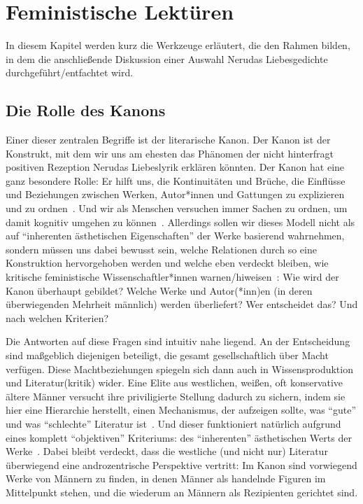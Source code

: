 \section{Feministische Lektüren}


In diesem Kapitel werden kurz die Werkzeuge erläutert, die den Rahmen bilden, in dem die anschließende Diskussion einer Auswahl Nerudas Liebesgedichte durchgeführt/entfachtet wird.

\subsection{Die Rolle des Kanons}

Einer dieser zentralen Begriffe ist der literarische Kanon.
Der Kanon ist der Konstrukt, mit dem wir uns am ehesten das Phänomen der nicht hinterfragt positiven Rezeption Nerudas Liebeslyrik erklären könnten.
Der Kanon hat eine ganz besondere Rolle:
Er hilft uns, die Kontinuitäten und Brüche, die Einflüsse und Beziehungen zwischen Werken, Autor*innen und Gattungen zu explizieren und zu ordnen~\cite{Kolodny1980}.
Und wir als Menschen versuchen immer Sachen zu ordnen, um damit kognitiv umgehen zu können~\cite{JorRus1999}.
Allerdings sollen wir dieses Modell nicht als auf ``inherenten ästhetischen Eigenschaften'' der Werke basierend wahrnehmen, sondern müssen uns dabei bewusst sein, welche Relationen durch so eine Konstruktion hervorgehoben werden und welche eben verdeckt bleiben, wie kritische feministische Wissenschaftler*innen warnen/hiweisen~\cite{Kolodny1980}:
Wie wird der Kanon überhaupt gebildet?
Welche Werke und Autor(*inn)en (in deren überwiegenden Mehrheit männlich) werden überliefert?
Wer entscheidet das?
Und nach welchen Kriterien?

Die Antworten auf diese Fragen sind intuitiv nahe liegend.
An der Entscheidung sind maßgeblich diejenigen beteiligt, die gesamt gesellschaftlich über Macht verfügen.
Diese Machtbeziehungen spiegeln sich dann auch in Wissensproduktion und Literatur(kritik) wider.
Eine Elite aus westlichen, weißen, oft konservative ältere Männer versucht ihre priviligierte Stellung dadurch zu sichern, indem sie hier eine Hierarchie herstellt, einen Mechanismus, der aufzeigen sollte, was ``gute'' und was ``schlechte'' Literatur ist~\cite{North2013}.
Und dieser funktioniert natürlich aufgrund eines komplett ``objektiven'' Kriteriums: des ``inherenten'' ästhetischen Werts der Werke~\cite{Kolodny1980}.
Dabei bleibt verdeckt, dass die westliche (und nicht nur) Literatur überwiegend eine androzentrische Perspektive vertritt:
Im Kanon sind vorwiegend Werke von Männern zu finden, in denen Männer als handelnde Figuren im Mittelpunkt stehen, und die wiederum an Männern als Rezipienten gerichtet sind.


